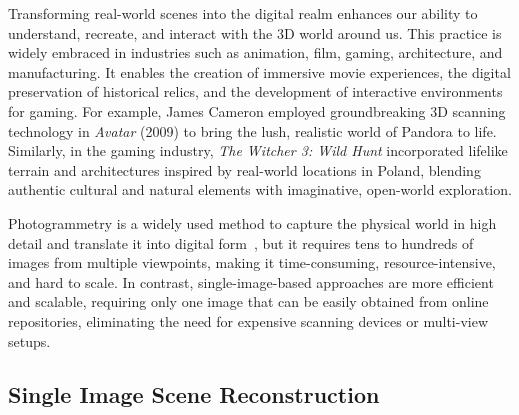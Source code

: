 

% 
Transforming real-world scenes into the digital realm enhances our ability to understand, recreate, and interact with the 3D world around us. This practice is widely embraced in industries such as animation, film, gaming, architecture, and manufacturing. It enables the creation of immersive movie experiences, the digital preservation of historical relics, and the development of interactive environments for gaming.
For example, James Cameron employed groundbreaking 3D scanning technology in \textit{Avatar} (2009) to bring the lush, realistic world of Pandora to life. Similarly, in the gaming industry, \textit{The Witcher 3: Wild Hunt} incorporated lifelike terrain and architectures inspired by real-world locations in Poland, blending authentic cultural and natural elements with imaginative, open-world exploration.


Photogrammetry is a widely used method to capture the physical world in high detail and translate it into digital form~\cite{MVS,chen2018deep,mildenhall2020nerf,barron2021mip,barron2022mip,muller2022instant,kerbl3Dgaussians}, but it requires tens to hundreds of images from multiple viewpoints, making it time-consuming, resource-intensive, and hard to scale. In contrast, single-image-based approaches are more efficient and scalable, requiring only one image that can be easily obtained from online repositories, eliminating the need for expensive scanning devices or multi-view setups.


\subsection{Single Image Scene Reconstruction}

